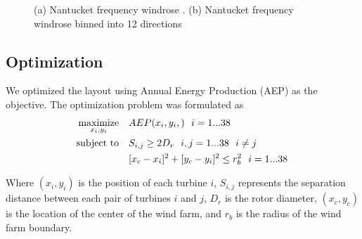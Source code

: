\documentclass[conf]{new-aiaa}
\begin{document}
{\begin{figure}[ht]
	\centering
	\caption{(a) Nantucket frequency windrose \cite{wrcc2017}. (b) Nantucket frequency windrose binned into 12 directions}
	\label{fig:windrose}
\end{figure}

\subsection{Optimization}

We optimized the layout using Annual Energy Production (AEP) as the objective. The optimization problem was formulated as
%
\begin{equation}
	\label{e:objective}
	\begin{aligned} [b]
	\underset{x_i,y_i}{\textrm{maximize}} \quad & AEP(x_i,y_i,)~~i=1...38\\
	\textrm{subject to} \quad & S_{i,j} \geq 2\*D_{r}~~i,j=1...38~~i \neq j\\
	 & [x_c-x_i]^2+[y_c-y_i]^2 \leq r_{b}^2~~i=1...38\\
	\end{aligned}
\end{equation}
%
Where $(x_i,y_i)$ is the position of each turbine $i$, $S_{i,j}$ represents the separation distance between each pair of turbines $i$ and $j$, $D_{r}$ is the rotor diameter, $(x_c,y_c)$ is the location of the center of the wind farm, and $r_b$ is the radius of the wind farm boundary.

}
\end{document}

